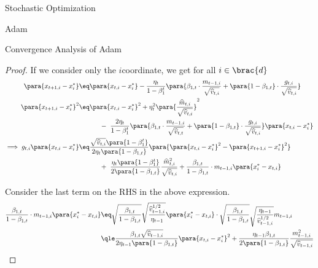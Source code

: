 \documentclass{article}
\begin{document}
\begin{psection}{Stochastic Optimization}
\begin{psubsection}{Adam}
\begin{pssubsection}{Convergence Analysis of Adam}
\begin{proof}
				If we consider only the $i$\tth coordinate, we get for all $i \in \brac{d}$
				\begin{align*}
					\para{x_{t+1, i} - x^{\ast}_i} &\eq \para{x_{t, i} - x^{\ast}_i} - \frac{\eta_t}{1 - \beta_1^t} \para{\beta_{1, t} \cdot \frac{m_{t - 1, i}}{\displaystyle \sqrt{\widehat{v}_{t, i}}} + \para{1 - \beta_{1, t}} \cdot \frac{g_{t, i}}{\displaystyle \sqrt{\widehat{v}_{t, i}}}} \\
					\para{x_{t+1, i} - x^{\ast}_i}^2 &\eq \para{x_{t, i} - x^{\ast}_i}^2 + \eta_t^2 \para{\frac{\widehat{m}_{t, i}}{\sqrt{\widehat{v}_{t, i}}}}^2 \\
					&\hspace{1.1cm} - \ \frac{2 \eta_t}{1 - \beta_1^t} \para{\beta_{1, t} \cdot \frac{m_{t - 1, i}}{\displaystyle \sqrt{\widehat{v}_{t, t}}} + \para{1 - \beta_{1, t}} \cdot \frac{g_{t, i}}{\displaystyle \sqrt{\widehat{v}_{t, i}}}} \para{x_{t, i} - x^{\ast}_i} \\
					\implies g_{t, i} \para{x_{t, i} - x^{\ast}_{i}} &\eq \frac{\displaystyle \sqrt{\widehat{v}_{t, i}} \para{1 - \beta_1^t}}{2 \eta_t \para{1 - \beta_{1, t}}} \para{\para{x_{t, i} - x^{\ast}_i}^2 - \para{x_{t+1, i} - x^{\ast}_i}^2} \\
					&\hspace{1.1cm} + \ \frac{\eta_t \para{1 - \beta_1^t}}{2 \para{1 - \beta_{1, t}}} \frac{\widehat{m}_{t, i}^2}{\displaystyle \sqrt{\widehat{v}_{t, i}}} + \frac{\beta_{1, t}}{1 - \beta_{1, t}} \cdot m_{t - 1, i} \para{x^{\ast}_i - x_{t, i}}
				\end{align*}

				Consider the last term on the RHS in the above expression.
				\begin{align*}
					\frac{\beta_{1, t}}{1 - \beta_{1, t}} \cdot m_{t - 1, i} \para{x^{\ast}_i - x_{t, i}} &\eq \sqrt{\frac{\beta_{1, t}}{1 - \beta_{1, t}}} \sqrt{\frac{\widehat{v}_{t - 1, i}^{1/2}}{\eta_{t - 1}}} \para{x^{\ast}_i - x_{t, i}} \cdot \sqrt{\frac{\beta_{1, t}}{1 - \beta_{1, t}}} \sqrt{\frac{\eta_{t - 1}}{\widehat{v}_{t - 1, i}^{1/2}}} m_{t - 1, i} \\
					&\qle \frac{\beta_{1, t} \displaystyle \sqrt{\widehat{v}_{t - 1, i}}}{2 \eta_{t - 1} \para{1 - \beta_{1, t}}} \para{x_{t, i} - x^{\ast}_i}^2 + \frac{\eta_{t - 1} \beta_{1, t}}{2 \para{1 - \beta_{1, t}}} \frac{m_{t - 1, i}^2}{\displaystyle \sqrt{\widehat{v}_{t - 1, i}}}
				\end{align*}


\end{proof}
\end{pssubsection}
\end{psubsection}
\end{psection}
\end{document}
